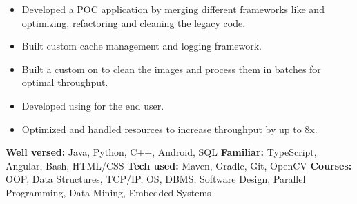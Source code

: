 \documentclass[10pt,a4paper,ragged2e, normalphoto]{altacv}
\begin{document}
\begin{itemize}
  \item Developed a POC application by merging different frameworks like and optimizing, refactoring and cleaning the legacy code.
  \item Built custom cache management and logging framework.
 \end{itemize}
\vspace{10pt}
\begin{itemize}
  \item Built a custom on to clean the images and process them in batches for optimal throughput.
  \item Developed using for the end user.
  \item Optimized and handled resources to increase throughput by up to 8x.
 \end{itemize}
 
 


\textbf{Well versed:} Java, Python, C++, Android, SQL\newline
\textbf{Familiar:} TypeScript, Angular, Bash, HTML/CSS\newline
\textbf{Tech used:} Maven, Gradle, Git, OpenCV\newline
\textbf{Courses:} OOP, Data Structures, TCP/IP, OS, DBMS, Software Design, Parallel
Programming, Data Mining, Embedded Systems
\end{document}
